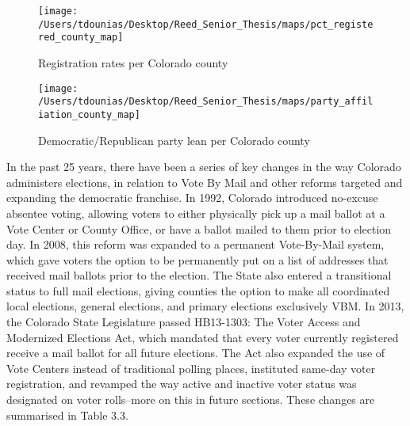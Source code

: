 \documentclass[12pt,twoside]{reedthesis}
\begin{document}
  \begin{figure}
  
  {\centering \texttt{[image: /Users/tdounias/Desktop/Reed\_Senior\_Thesis/maps/pct\_registered\_county\_map]} 
  
  }
  
  \caption[Registration rates per Colorado county]{Registration rates per Colorado county}\label{fig:reg per county map}
  \end{figure}
  
  \begin{figure}
  
  {\centering \texttt{[image: /Users/tdounias/Desktop/Reed\_Senior\_Thesis/maps/party\_affiliation\_county\_map]} 
  
  }
  
  \caption[Democratic/Republican party lean per Colorado county]{Democratic/Republican party lean per Colorado county}\label{fig:party reg per county map}
  \end{figure}
  
  In the past 25 years, there have been a series of key changes in the way
  Colorado administers elections, in relation to Vote By Mail and other
  reforms targeted and expanding the democratic franchise. In 1992,
  Colorado introduced no-excuse absentee voting, allowing voters to either
  physically pick up a mail ballot at a Vote Center or County Office, or
  have a ballot mailed to them prior to election day. In 2008, this reform
  was expanded to a permanent Vote-By-Mail system, which gave voters the
  option to be permanently put on a list of addresses that received mail
  ballots prior to the election. The State also entered a transitional
  status to full mail elections, giving counties the option to make all
  coordinated local elections, general elections, and primary elections
  exclusively VBM. In 2013, the Colorado State Legislature passed
  HB13-1303: The Voter Access and Modernized Elections Act, which mandated
  that every voter currently registered receive a mail ballot for all
  future elections. The Act also expanded the use of Vote Centers instead
  of traditional polling places, instituted same-day voter registration,
  and revamped the way active and inactive voter status was designated on
  voter rolls--more on this in future sections. These changes are
  summarised in Table 3.3.
  
\end{document}

